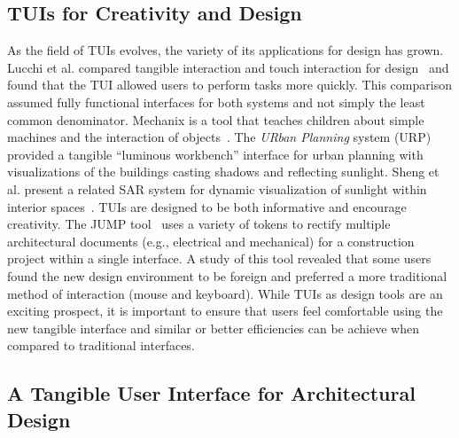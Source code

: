 \documentclass[preprint]{elsarticle}
\begin{document}
\subsection{TUIs for Creativity and Design}

As the field of TUIs evolves, the variety of its applications for
design has grown.  Lucchi et al. compared tangible interaction and
touch interaction for design~\cite{1709917} and found that the TUI
allowed users to perform tasks more quickly.  This comparison assumed
fully functional interfaces for both systems and not simply the least
common denominator.  
%
Mechanix is a tool that
teaches children about simple machines and the interaction of
objects~\cite{TsengBB11}.  
%
The {\em URban Planning} system
(URP)~\cite{Underkoffler:1999:ULW:302979.303114} provided a tangible
``luminous workbench'' interface for urban planning with
visualizations of the buildings casting shadows and reflecting
sunlight.
%
Sheng et al. present a related SAR system for dynamic
visualization of sunlight within interior spaces~\cite{sheng_TVCG}.
%
TUIs are designed to be both informative and encourage creativity.
The JUMP tool~\cite{1268540} uses a variety of tokens to rectify
multiple architectural documents (e.g., electrical and mechanical) for
a construction project within a single interface.  A study of this
tool revealed that some users found the new design environment to be
foreign and preferred a more traditional method of interaction (mouse
and keyboard).  
%
While TUIs as design tools are an exciting prospect, it is important to
ensure that users feel comfortable using the new tangible interface
and similar or better efficiencies can be achieve when compared to
traditional interfaces.


\subsection{A Tangible User Interface for Architectural Design}
\end{document}
